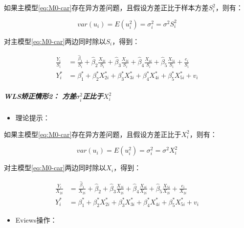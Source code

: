 \documentclass[12pt,(landscape,a4paper),(portrait,a4paper)]{article}
\providecommand{\tightlist}{%
  \setlength{\itemsep}{0pt}\setlength{\parskip}{0pt}}
\let\oldsubparagraph\subparagraph
\renewcommand{\subparagraph}[1]{\oldsubparagraph{#1}\mbox{}}
\begin{document}
如果主模型\eqref{eq:M0-car}存在异方差问题，且假设方差正比于样本方差\(S^2_i\)，则有：

\begin{equation}
var(u_i)=E(u^2_i)=\sigma^2_i=\sigma^2S^2_i \label{eq:WLS-S2}
\end{equation}

对主模型\eqref{eq:M0-car}两边同时除以\(S_i\)，得到：

\begin{align}
\frac{Y_i}{S_i} &=\frac{\hat{\beta}_1}{S_i}+\hat{\beta}_2\frac{X_{2i}}{S_i}+\hat{\beta}_3\frac{X_{3i}}{S_i}+\hat{\beta}_4\frac{X_{4i}}{S_i}+\hat{\beta}_5\frac{X_{5i}}{S_i}+\frac{e_{i}}{S_i}\label{eq:WLS-S2-adj}\\
Y^{\ast}_i &=\beta^{\ast}_1+\beta^{\ast}_2X^{\ast}_{2i}+\beta^{\ast}_3X^{\ast}_{3i}+\beta^{\ast}_4X^{\ast}_{4i}+\beta^{\ast}_5X^{\ast}_{5i}+v_{i} \label{eq:WLS1-S2-red} 
\end{align}

\hypertarget{wls2-sigma2_ix2_i}{%
\subparagraph{\texorpdfstring{WLS矫正情形2：
方差\(\sigma^2_i\)正比于\(X^2_i\)}{WLS矫正情形2： 方差\textbackslash{}sigma\^{}2\_i正比于X\^{}2\_i}}\label{wls2-sigma2_ix2_i}}

\begin{itemize}
\tightlist
\item
  理论提示：
\end{itemize}

如果主模型\eqref{eq:M0-car}存在异方差问题，且假设方差正比于\(X^2_i\)，则有：

\begin{equation}
var(u_i)=E(u^2_i)=\sigma^2_i=\sigma^2X^2_i \label{eq:WLS-X2}
\end{equation}

对主模型\eqref{eq:M0-car}两边同时除以\(X_i\)，得到：

\begin{align}
\frac{Y_i}{X_{2i}} &=\frac{\hat{\beta}_1}{X_{2i}}+\hat{\beta}_2+\hat{\beta}_3\frac{X_{3i}}{X_{2i}}+\hat{\beta}_4\frac{X_{4i}}{X_{2i}}+\hat{\beta}_5\frac{X_{5i}}{X_{2i}}+\frac{e_{i}}{X_{2i}}\label{eq:WLS-X2-adj}\\
Y^{\ast}_i &=\beta^{\ast}_1+\beta^{\ast}_2X^{\ast}_{2i}+\beta^{\ast}_3X^{\ast}_{3i}+\beta^{\ast}_4X^{\ast}_{4i}+\beta^{\ast}_5X^{\ast}_{5i}+v_{i} \label{eq:WLS1-X2-red}
\end{align}

\begin{itemize}
\tightlist
\item
  Eviews操作：
\end{itemize}
\end{document}
